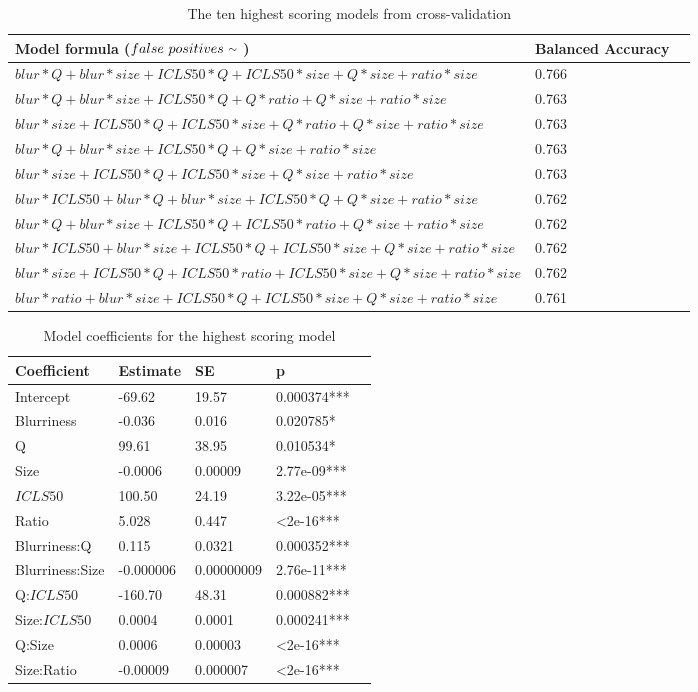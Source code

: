 \documentclass[12pt]{article}
\newcommand{\mytilde}{\raise.17ex\hbox{$\scriptstyle\mathtt{\sim}$}} %
\begin{document}
\begin{table}[ht]
	\caption{The ten highest scoring models from cross-validation}
	\tiny
	\begin{tabular}{@{}llr@{}}
		\toprule
		Model formula ($false \ positives \ \mytilde \ $) & Balanced Accuracy \\ 
		\midrule
		$blur*Q+blur*size+ICLS50*Q+ICLS50*size+Q*size+ratio*size$ & 0.766 \\
		$blur*Q+blur*size+ICLS50*Q+Q*ratio+Q*size+ratio*size$ & 0.763 \\
		$blur*size+ICLS50*Q+ICLS50*size+Q*ratio+Q*size+ratio*size$ & 0.763 \\
		$blur*Q+blur*size+ICLS50*Q+Q*size+ratio*size$ & 0.763 \\
		$blur*size+ICLS50*Q+ICLS50*size+Q*size+ratio*size$ & 0.763 \\
		$blur*ICLS50+blur*Q+blur*size+ICLS50*Q+Q*size+ratio*size$ & 0.762 \\
		$blur*Q+blur*size+ICLS50*Q+ICLS50*ratio+Q*size+ratio*size$ & 0.762 \\
		$blur*ICLS50+blur*size+ICLS50*Q+ICLS50*size+Q*size+ratio*size$ & 0.762 \\
		$blur*size+ICLS50*Q+ICLS50*ratio+ICLS50*size+Q*size+ratio*size$ & 0.762 \\
		$blur*ratio+blur*size+ICLS50*Q+ICLS50*size+Q*size+ratio*size$ & 0.761 \\  
		\bottomrule
	\end{tabular}
	\label{tab:CVtop10}
\end{table}

\begin{table}[ht]
	\caption{Model coefficients for the highest scoring model}
	\begin{tabular}{@{}llllr@{}}
		\toprule
		Coefficient & Estimate & SE & p \\ 
		\midrule
		Intercept & -69.62 & 19.57 & 0.000374***\\
		Blurriness & -0.036 & 0.016 & 0.020785*\\
		Q & 99.61 & 38.95 &  0.010534*\\
		Size & -0.0006 & 0.00009 & 2.77e-09***\\
		$ICLS50$ & 100.50 & 24.19 & 3.22e-05***\\
		Ratio & 5.028 & 0.447 &  \textless 2e-16***\\
		Blurriness:Q & 0.115 & 0.0321 & 0.000352***\\
		Blurriness:Size & -0.000006 & 0.00000009 & 2.76e-11***\\
		Q:$ICLS50$ & -160.70 & 48.31 & 0.000882*** \\
		Size:$ICLS50$ &  0.0004 & 0.0001 & 0.000241***\\
		Q:Size &  0.0006 & 0.00003 &  \textless 2e-16*** \\
		Size:Ratio & -0.00009 & 0.000007 & \textless 2e-16*** \\ 
		\bottomrule
	\end{tabular}
	\label{tab:CVtopmodel}
\end{table}
\end{document}
